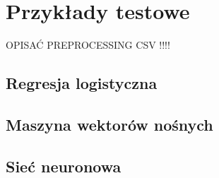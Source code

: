 \section{Przykłady testowe}

OPISAĆ PREPROCESSING CSV !!!!

\subsection{Regresja logistyczna}
\subsection{Maszyna wektorów nośnych}
\subsection{Sieć neuronowa}